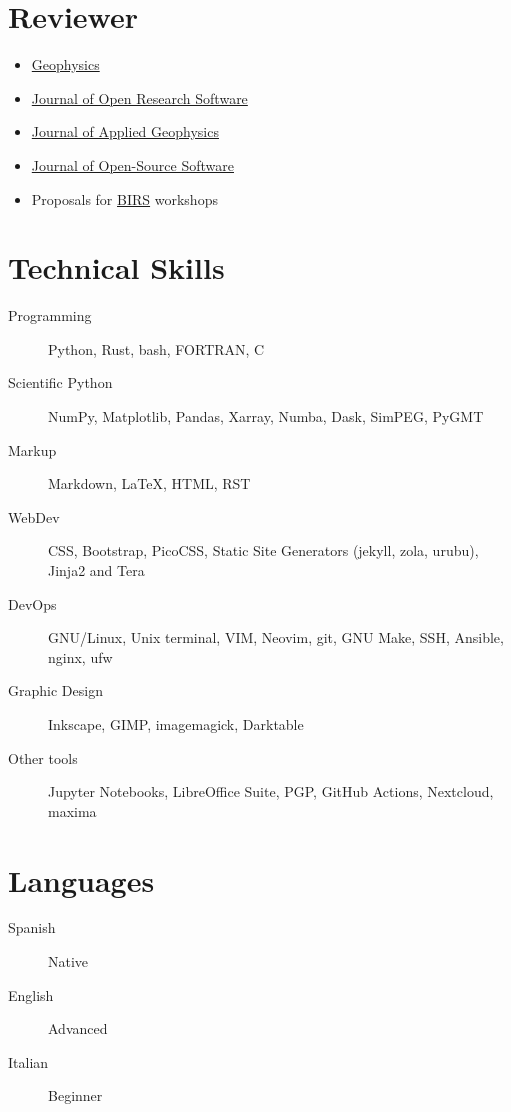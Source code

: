 \documentclass[11pt, letter]{article}
\begin{document}
\newpage
\section{Reviewer}

\begin{itemize}[label={}, leftmargin=*]
    \item \href{https://seg.org/Publications/Journals/Geophysics}{Geophysics}
    \item \href{https://openresearchsoftware.metajnl.com}{Journal of Open Research Software}
    \item \href{https://www.sciencedirect.com/journal/journal-of-applied-geophysics}{Journal of Applied Geophysics}
    \item \href{https://joss.theoj.org/}{Journal of Open-Source Software}
    \item Proposals for \href{https://www.birs.ca}{BIRS} workshops
\end{itemize}

\section{Technical Skills}

\begin{description}
    \item[Programming] Python, Rust, bash, FORTRAN, C
    \item[Scientific Python] NumPy, Matplotlib, Pandas, Xarray, Numba, Dask,
        SimPEG, PyGMT
    \item[Markup] Markdown, LaTeX, HTML, RST
    \item[WebDev] CSS, Bootstrap, PicoCSS, Static Site Generators (jekyll,
        zola, urubu), Jinja2 and Tera
    \item[DevOps] GNU/Linux, Unix terminal, VIM, Neovim, git, GNU Make, SSH,
        Ansible, nginx, ufw
    \item[Graphic Design] Inkscape, GIMP, imagemagick, Darktable
    \item[Other tools] Jupyter Notebooks, LibreOffice Suite, PGP, GitHub
        Actions, Nextcloud, maxima
\end{description}

\section{Languages}

\begin{description}
    \item[Spanish] Native
    \item[English] Advanced
    \item[Italian] Beginner
\end{description}
\end{document}
